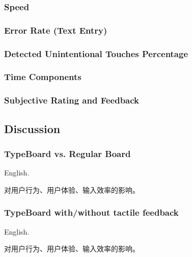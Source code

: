 \subsubsection{Speed}

\subsubsection{Error Rate (Text Entry)}

\subsubsection{Detected Unintentional Touches Percentage}

\subsubsection{Time Components}

\subsubsection{Subjective Rating and Feedback}

\subsection{Discussion}

\subsubsection{TypeBoard vs. Regular Board}

English.

对用户行为、用户体验、输入效率的影响。

\subsubsection{TypeBoard with/without tactile feedback}

English.

对用户行为、用户体验、输入效率的影响。
